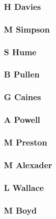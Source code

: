\documentclass[letterpaper,10pt,english]{sphinxmanual}
\begin{document}
\subsubsection{H Davies}
\label{\detokenize{investors:h-davies}}

\subsubsection{M Simpson}
\label{\detokenize{investors:m-simpson}}

\subsubsection{S Hume}
\label{\detokenize{investors:s-hume}}

\subsubsection{B Pullen}
\label{\detokenize{investors:b-pullen}}

\subsubsection{G Caines}
\label{\detokenize{investors:g-caines}}

\subsubsection{A Powell}
\label{\detokenize{investors:a-powell}}

\subsubsection{M Preston}
\label{\detokenize{investors:m-preston}}

\subsubsection{M Alexader}
\label{\detokenize{investors:m-alexader}}

\subsubsection{L Wallace}
\label{\detokenize{investors:l-wallace}}

\subsubsection{M Boyd}
\label{\detokenize{investors:m-boyd}}
\end{document}
